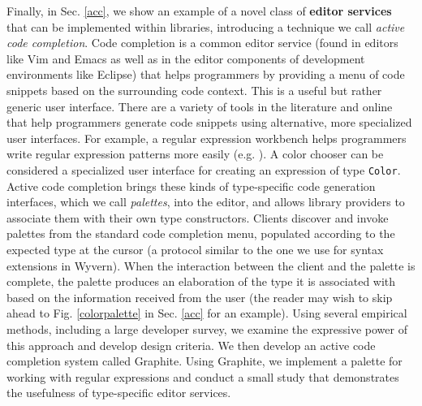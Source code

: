 %

Finally, in Sec. \ref{acc}, we show an example of a novel class of \textbf{editor services} that can be implemented within libraries, introducing a technique we call \emph{active code completion}. Code completion is a common editor service (found in editors like Vim and Emacs as well as in the editor components of development environments like Eclipse) that helps programmers  by providing a menu of code snippets based on the surrounding code context. This is a useful but rather generic user interface. There are a variety of tools in the literature and online that help programmers generate code snippets using alternative, more specialized user interfaces. For example, a regular expression workbench helps programmers write regular expression patterns more easily (e.g. \cite{IntelliJRegexp,_txt2re:_????}). A color chooser can be considered a specialized user interface for creating an expression of type \verb|Color|. 
Active code completion brings these kinds of type-specific code generation interfaces, which we call \emph{palettes}, into the editor, and allows library providers to associate them with their own type constructors. Clients discover and invoke palettes from the standard code completion menu, populated according to the expected type at the cursor (a protocol similar to the one we use for syntax extensions in Wyvern). When the interaction between the client and the palette is complete, the palette produces an elaboration of the type it is associated with based on the information received from the user (the reader may wish to skip ahead to Fig. \ref{colorpalette} in Sec. \ref{acc} for an example). Using several empirical
methods, including a large developer survey, we examine the expressive power of this approach and develop design criteria. We then develop an active code completion system called Graphite. 
Using Graphite,
we implement a palette for working with regular expressions and conduct a small study that demonstrates the usefulness of type-specific editor services.%

